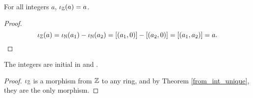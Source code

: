 \documentclass[../../math.tex]{subfiles}
\begin{document}
\begin{theorem}
    For all integers $a$, $\iota_{\mathbb{Z}}(a) = a$.
\end{theorem}
\begin{proof}
    \[
        \iota_{\mathbb{Z}}(a) = \iota_{\mathbb{N}}(a_1) - \iota_{\mathbb{N}}(a_2) = [(a_1, 0)] - [(a_2, 0)] = [(a_1, a_2)] =
        a.
    \]
\end{proof}

\begin{theorem}
    The integers are initial in  and .
\end{theorem}
\begin{proof}
    $\iota_{\mathbb{Z}}$ is a morphism from $\mathbb{Z}$ to any ring, and by Theorem
    \ref{from_int_unique}, they are the only morphism.
\end{proof}
\end{document}
